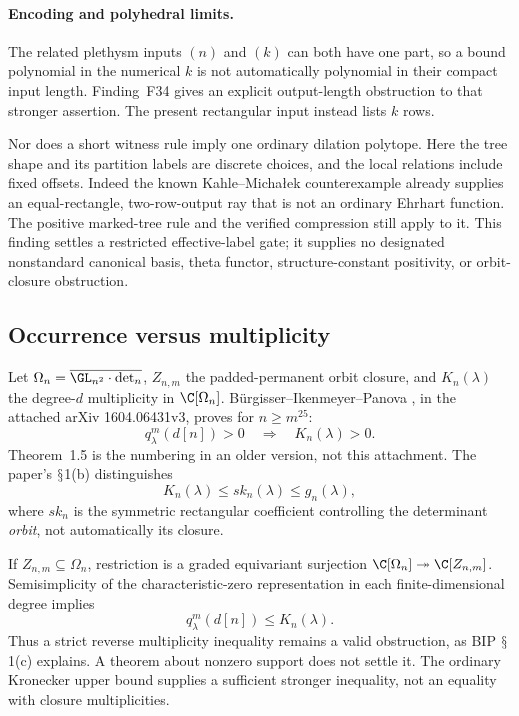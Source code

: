 \documentclass[11pt,a4paper]{article}
\renewcommand{\S}{\ensuremath{\mathsection}}
\newcommand{\fid}[1]{\textsf{#1}}\newcommand{\gate}[1]{\textsf{#1}}
\theoremstyle{named}\newtheorem{finding}{Finding}[section]
\theoremstyle{definition}\newtheorem{definition}[finding]{Definition}
\theoremstyle{remark}\newtheorem{remark}[finding]{Remark}
\begin{document}
\paragraph{Encoding and polyhedral limits.}
The related plethysm inputs $(n)$ and $(k)$ can both have one part,
so a bound polynomial in the numerical $k$ is not automatically
polynomial in their compact input length. Finding~\fid{F34} gives
an explicit output-length obstruction to that stronger assertion.
The present rectangular input instead lists $k$ rows.

Nor does a short witness rule imply one ordinary dilation polytope.
Here the tree shape and its partition labels are discrete choices,
and the local relations include fixed offsets. Indeed the known
Kahle--Micha{\l}ek counterexample
\cite[Theorem~5 and Remark~6, p.~4; rectangular identification, p.~6]{KM}
already supplies an equal-rectangle, two-row-output ray that is
not an ordinary Ehrhart function. The positive marked-tree rule
and the verified compression still apply to it.
This finding settles a restricted effective-label gate; it supplies
no designated nonstandard canonical basis, theta functor,
structure-constant positivity, or orbit-closure obstruction.


\subsection{Occurrence versus multiplicity}
Let $\Omega_n=\overline{\GL_{n^2}\cdot\det_n}$, $Z_{n,m}$ the padded-permanent orbit closure, and $K_n(\lambda)$ the degree-$d$ multiplicity in $\C[\Omega_n]$. B\"urgisser--Ikenmeyer--Panova \cite[Theorem 1.4]{BIP}, in the attached arXiv 1604.06431v3, proves for $n\ge m^{25}$:
\[
 q^m_\lambda(d[n])>0\quad\Longrightarrow\quad K_n(\lambda)>0.
\]
Theorem~1.5 is the numbering in an older version, not this attachment. The paper's \S1(b) distinguishes
\[
 K_n(\lambda)\le sk_n(\lambda)\le g_n(\lambda),
\]
where $sk_n$ is the symmetric rectangular coefficient controlling the determinant \emph{orbit}, not automatically its closure.

If $Z_{n,m}\subseteq\Omega_n$, restriction is a graded equivariant surjection
$\C[\Omega_n]\twoheadrightarrow\C[Z_{n,m}]$. Semisimplicity of the characteristic-zero representation in each finite-dimensional degree implies
\[
 q^m_\lambda(d[n])\le K_n(\lambda).
\]
Thus a strict reverse multiplicity inequality remains a valid obstruction, as BIP \S1(c) explains. A theorem about nonzero support does not settle it. The ordinary Kronecker upper bound supplies a sufficient stronger inequality, not an equality with closure multiplicities.
\end{document}

